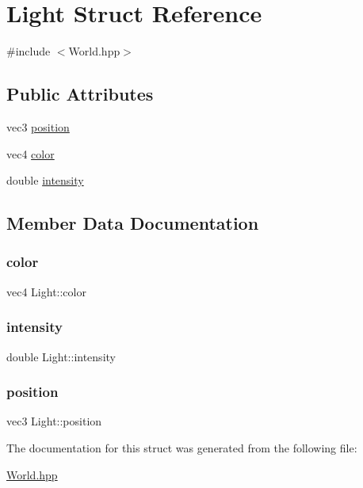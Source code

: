 \hypertarget{structLight}{}\section{Light Struct Reference}
\label{structLight}


{\ttfamily \#include $<$World.\+hpp$>$}

\subsection*{Public Attributes}
\begin{DoxyCompactItemize}
\item 
vec3 \mbox{\hyperlink{structLight_a0d6a0c891a474eedc7d402352becc507}{position}}
\item 
vec4 \mbox{\hyperlink{structLight_a06b32ab968c274a668b8e56133713bfb}{color}}
\item 
double \mbox{\hyperlink{structLight_aac3f4a6cf2fe722e09bd7e219ae03a3e}{intensity}}
\end{DoxyCompactItemize}


\subsection{Member Data Documentation}
\mbox{\label{structLight_a06b32ab968c274a668b8e56133713bfb}} 
\subsubsection{\texorpdfstring{color}{color}}
{\footnotesize\ttfamily vec4 Light\+::color}

\mbox{\label{structLight_aac3f4a6cf2fe722e09bd7e219ae03a3e}} 
\subsubsection{\texorpdfstring{intensity}{intensity}}
{\footnotesize\ttfamily double Light\+::intensity}

\mbox{\label{structLight_a0d6a0c891a474eedc7d402352becc507}} 
\subsubsection{\texorpdfstring{position}{position}}
{\footnotesize\ttfamily vec3 Light\+::position}



The documentation for this struct was generated from the following file\+:\begin{DoxyCompactItemize}
\item 
\mbox{\hyperlink{World_8hpp}{World.\+hpp}}\end{DoxyCompactItemize}
